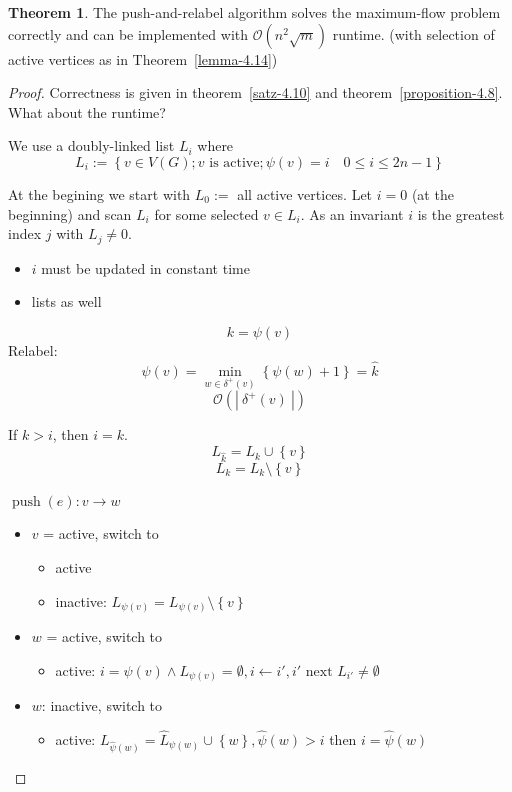 \documentclass[a4paper]{article}
\theoremstyle{definition}
\newtheorem{theorem}{Theorem}
\newcommand{\card}[1]{\left|\:\!#1\:\!\right|}
\newcommand{\set}[1]{\left\{#1\right\}}
\DeclareMathOperator{\push}{push}
\begin{document}
\begin{theorem}\label{satz-4.15}
  The push-and-relabel algorithm solves the maximum-flow problem correctly and can be implemented with $\mathcal{O}(n^2 \sqrt{m})$ runtime.
  (with selection of active vertices as in Theorem~\ref{lemma-4.14})
\end{theorem}

\begin{proof}
  Correctness is given in theorem~\ref{satz-4.10} and theorem~\ref{proposition-4.8}. What about the runtime?

  We use a doubly-linked list $L_i$ where
  \[
    L_i := \set{v \in V(G); v \text{ is active}; \psi(v) = i \quad 0 \leq i \leq 2n - 1}
  \]

  At the begining we start with $L_0 := $ all active vertices.
  Let $i = 0$ (at the beginning) and scan $L_i$ for some selected $v \in L_i$.
  As an invariant $i$ is the greatest index $j$ with $L_j \neq 0$.

  \begin{itemize}
    \item $i$ must be updated in constant time
    \item lists as well
  \end{itemize}

  \[ k = \psi(v) \]
  Relabel: \[ \psi(v) = \min_{w\in\delta^+(v)}{\set{\psi(w) + 1}} = \hat k \]
  \[ \mathcal{O}(\card{\delta^+(v)}) \]

  If $k > i$, then $i = k$.
  \[ L_{\hat k} = L_k \cup \set{v} \]
  \[ L_k = L_k \setminus \set{v} \]

  $\push(e): v \rightarrow w$
  \begin{itemize}
    \item $v$ = active, switch to
      \begin{itemize}
        \item active
        \item inactive: $L_{\psi(v)} = L_{\psi(v)} \setminus \set{v}$
      \end{itemize}
    \item $w$ = active, switch to
      \begin{itemize}
        \item active: $i = \psi(v) \land L_{\psi(v)} = \emptyset, i \leftarrow i', i' \text{ next } L_{i'} \neq \emptyset$
      \end{itemize}
    \item $w$: inactive, switch to
      \begin{itemize}
        \item active: $L_{\hat \psi(w)} = \hat L_{\psi(w)} \cup \set{w}, \hat\psi(w) > i$ then $i = \hat\psi(w)$
      \end{itemize}
  \end{itemize}


\end{proof}
\end{document}

